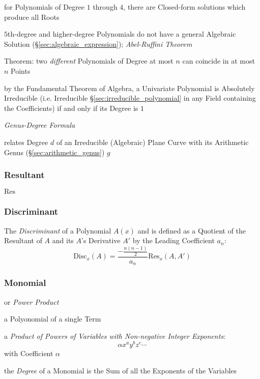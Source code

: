 for Polynomials of Degree $1$ through $4$, there are Closed-form solutions which
produce all Roots

$5$th-degree and higher-degree Polynomials do not have a general Algebraic
Solution (\S\ref{sec:algebraic_expression}); \emph{Abel-Ruffini Theorem}

Theorem: two \emph{different} Polynomials of Degree at most $n$ can coincide in
at most $n$ Points

by the Fundamental Theorem of Algebra, a Univariate Polynomial is Absolutely
Irreducible (i.e. Irreducible \S\ref{sec:irreducible_polynomial} in any Field
containing the Coefficients) if and only if its Degree is $1$

\emph{Genus-Degree Formula}

relates Degree $d$ of an Irreducible (Algebraic) Plane Curve with its Arithmetic
Genus (\S\ref{sec:arithmetic_genus}) $g$



\subsubsection{Resultant}\label{sec:resultant}

$\mathrm{Res}$



\subsubsection{Discriminant}\label{sec:discriminant}

The \emph{Discriminant} of a Polynomial $A(x)$ and is defined as a Quotient of
the Resultant of $A$ and its $A$'s Derivative $A'$ by the Leading Coefficient
$a_n$:
\[
  \mathrm{Disc}_x(A) = \frac{-\frac{n(n-1)}{2}}{a_n} \mathrm{Res}_x(A, A')
\]



\subsubsection{Monomial}\label{sec:monomial}

or \emph{Power Product}

a Polyonomial of a single Term

a \emph{Product of Powers of Variables with Non-negative Integer Exponents}:
\[
  \alpha x^a y^b z^c \cdots
\]
with Coefficient $\alpha$

the \emph{Degree} of a Monomial is the Sum of all the Exponents of the
Variables



